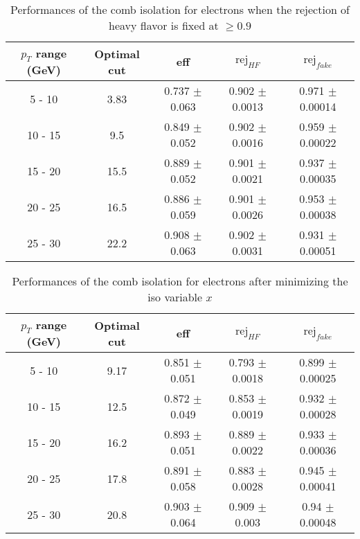 \begin{table}[htbp]
   \centering
   \begin{tabular}{|c|c|c|c|c|}
      \hline
      $p_T$ range (GeV) & Optimal cut & eff & $\textrm{rej}_{HF}$ & $\textrm{rej}_{fake}$ \\
      \hline
      5 - 10 & 3.83 & 0.737 $\pm$ 0.063 & 0.902 $\pm$ 0.0013 & 0.971 $\pm$ 0.00014 \\
      \hline
      10 - 15 & 9.5 & 0.849 $\pm$ 0.052 & 0.902 $\pm$ 0.0016 & 0.959 $\pm$ 0.00022 \\
      \hline
      15 - 20 & 15.5 & 0.889 $\pm$ 0.052 & 0.901 $\pm$ 0.0021 & 0.937 $\pm$ 0.00035 \\
      \hline
      20 - 25 & 16.5 & 0.886 $\pm$ 0.059 & 0.901 $\pm$ 0.0026 & 0.953 $\pm$ 0.00038 \\
      \hline
      25 - 30 & 22.2 & 0.908 $\pm$ 0.063 & 0.902 $\pm$ 0.0031 & 0.931 $\pm$ 0.00051 \\
      \hline
   \end{tabular}
   \caption{\small{Performances of the comb isolation for electrons when the rejection of heavy flavor is fixed at $\geq 0.9$}\label{tab:comb_elec_pureHf}}
\end{table}






\begin{table}[htbp]
   \centering
   \begin{tabular}{|c|c|c|c|c|}
      \hline
      $p_T$ range (GeV) & Optimal cut & eff & $\textrm{rej}_{HF}$ & $\textrm{rej}_{fake}$ \\
      \hline
      5 - 10 & 9.17 & 0.851 $\pm$ 0.051 & 0.793 $\pm$ 0.0018 & 0.899 $\pm$ 0.00025 \\
      \hline
      10 - 15 & 12.5 & 0.872 $\pm$ 0.049 & 0.853 $\pm$ 0.0019 & 0.932 $\pm$ 0.00028 \\
      \hline
      15 - 20 & 16.2 & 0.893 $\pm$ 0.051 & 0.889 $\pm$ 0.0022 & 0.933 $\pm$ 0.00036 \\
      \hline
      20 - 25 & 17.8 & 0.891 $\pm$ 0.058 & 0.883 $\pm$ 0.0028 & 0.945 $\pm$ 0.00041 \\
      \hline
      25 - 30 & 20.8 & 0.903 $\pm$ 0.064 & 0.909 $\pm$ 0.003 & 0.94 $\pm$ 0.00048 \\
      \hline
   \end{tabular}
   \caption{\small{Performances of the comb isolation for electrons after minimizing the iso variable $x$}\label{tab:comb_elec_opt}}
\end{table}






